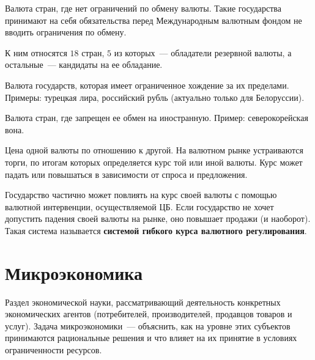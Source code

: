 \documentclass[12pt]{article}
\begin{document}
    \begin{definition}
    	Валюта стран, где нет ограничений по обмену валюты. Такие государства принимают на себя обязательства перед Международным валютным фондом не вводить ограничения по обмену.
    	
    	К ним относятся $18$ стран, $5$ из которых~--- обладатели резервной валюты, а остальные~--- кандидаты на ее обладание.
    \end{definition}
    
    \begin{definition}
    	Валюта государств, которая имеет ограниченное хождение за их пределами. Примеры: турецкая лира, российский рубль (актуально только для Белоруссии).
    \end{definition}
    
    \begin{definition}
    	Валюта стран, где запрещен ее обмен на иностранную. Пример: северокорейская вона.
    \end{definition}
    
    \begin{definition}
    	Цена одной валюты по отношению к другой. На валютном рынке устраиваются торги, по итогам которых определяется курс той или иной валюты. Курс может падать или повышаться в зависимости от спроса и предложения.
    \end{definition}
    
    \begin{note}
    	Государство частично может повлиять на курс своей валюты с помощью валютной интервенции, осуществляемой ЦБ. Если государство не хочет допустить падения своей валюты на рынке, оно повышает продажи (и наоборот). Такая система называется \textbf{системой гибкого курса валютного регулирования}.
    \end{note}
    
    \section{Микроэкономика}
    
    \begin{definition}[Микроэкономика]
    	Раздел экономической науки, рассматривающий деятельность конкретных экономических агентов (потребителей, производителей, продавцов товаров и услуг). Задача микроэкономики~--- объяснить, как на уровне этих субъектов принимаются рациональные решения и что влияет на их принятие в условиях ограниченности ресурсов.
    \end{definition}
    
\end{document}
